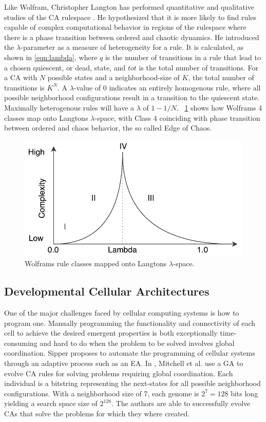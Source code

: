 Like Wolfram, Christopher Langton has performed quantitative and qualitative
studies of the CA rulespace \cite{Langton1990}. He hypothesized that it is more
likely to find rules capable of complex computational behavior in regions of the
rulespace where there is a phase transition between ordered and chaotic
dynamics. He introduced the $\lambda$-parameter as a measure of heterogeneity
for a rule. It is calculated, as shown in \ref{eqn:lambda}, where $q$ is the
number of transitions in a rule that lead to a chosen quiescent, or dead, state,
and $tot$ is the total number of transitions. For a CA with $N$ possible states
and a neighborhood-size of $K$, the total number of transitions is $K^N$. A
$\lambda$-value of $0$ indicates an entirely homogenous rule, where all possible
neighborhood configurations result in a transition to the quiescent state.
Maximally heterogenous rules will have a $\lambda$ of $1-1/N$.
\figurename~\ref{fig:ca-classes} shows how Wolframs 4 classes map onto Langtons
$\lambda$-space, with Class 4 coinciding with phase transition between ordered
and chaos behavior, the so called Edge of Chaos.

\begin{figure}[ht]
  \centering
  \includegraphics[width=0.5\linewidth]{fig/ca-classes}
  \caption{Wolframs rule classes mapped onto Langtons $\lambda$-space.}
  \label{fig:ca-classes}
\end{figure}


\subsection{Developmental Cellular Architectures}

One of the major challenges faced by cellular computing systems is how to
program one. Manually programming the functionality and connectivity of each
cell to achieve the desired emergent properties is both exceptionally
time-consuming and hard to do when the problem to be solved involves global
coordination. Sipper proposes to automate the programming of cellular systems
through an adaptive process such as an EA. In \cite{Mitchell1993}, Mitchell et
al. use a GA to evolve CA rules for solving problems requiring global
coordination. Each individual is a bitstring representing the next-states for
all possible neighborhood configurations. With a neighborhood size of 7, each
genome is $2^7=128$ bits long yielding a search space size of $2^{128}$. The
authors are able to successfully evolve CAs that solve the problems for which
they where created.

